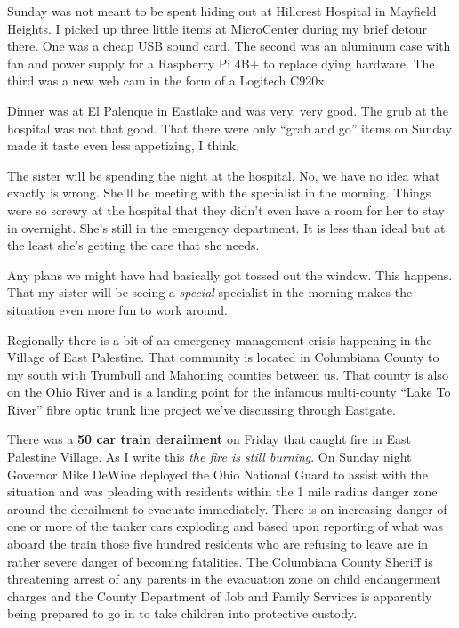 Sunday was not meant to be spent hiding out at Hillcrest Hospital in
Mayfield Heights. I picked up three little items at MicroCenter during
my brief detour there. One was a cheap USB sound card. The second was an
aluminum case with fan and power supply for a Raspberry Pi 4B+ to
replace dying hardware. The third was a new web cam in the form of a
Logitech C920x.

Dinner was at \href{https://elpalenqueineastlake.com/}{El Palenque} in
Eastlake and was very, very good. The grub at the hospital was not that
good. That there were only ``grab and go'' items on Sunday made it taste
even less appetizing, I think.

The sister will be spending the night at the hospital. No, we have no
idea what exactly is wrong. She'll be meeting with the specialist in the
morning. Things were so screwy at the hospital that they didn't even
have a room for her to stay in overnight. She's still in the emergency
department. It is less than ideal but at the least she's getting the
care that she needs.

Any plans we might have had basically got tossed out the window. This
happens. That my sister will be seeing a \emph{special} specialist in
the morning makes the situation even more fun to work around.

Regionally there is a bit of an emergency management crisis happening in
the Village of East Palestine. That community is located in Columbiana
County to my south with Trumbull and Mahoning counties between us. That
county is also on the Ohio River and is a landing point for the infamous
multi-county ``Lake To River'' fibre optic trunk line project we've
discussing through Eastgate.

There was a \textbf{50 car train derailment} on Friday that caught fire
in East Palestine Village. As I write this \emph{the fire is still
burning}. On Sunday night Governor Mike DeWine deployed the Ohio
National Guard to assist with the situation and was pleading with
residents within the 1 mile radius danger zone around the derailment to
evacuate immediately. There is an increasing danger of one or more of
the tanker cars exploding and based upon reporting of what was aboard
the train those five hundred residents who are refusing to leave are in
rather severe danger of becoming fatalities. The Columbiana County
Sheriff is threatening arrest of any parents in the evacuation zone on
child endangerment charges and the County Department of Job and Family
Services is apparently being prepared to go in to take children into
protective custody.

